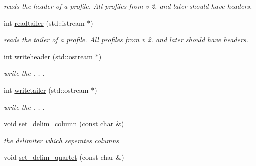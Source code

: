 \begin{DoxyCompactItemize}
\begin{DoxyCompactList}\small\item\em reads the header of a profile. All profiles from v 2. and later should have headers. \end{DoxyCompactList}\item 
\hypertarget{classprofile__header_af1e7906989052ab477b0cc6819109ce1}{int \hyperlink{classprofile__header_af1e7906989052ab477b0cc6819109ce1}{readtailer} (std\-::istream $\ast$)}\label{classprofile__header_af1e7906989052ab477b0cc6819109ce1}

\begin{DoxyCompactList}\small\item\em reads the tailer of a profile. All profiles from v 2. and later should have headers. \end{DoxyCompactList}\item 
\hypertarget{classprofile__header_aa3cf9f42826a02edaec056d98a12bf55}{int \hyperlink{classprofile__header_aa3cf9f42826a02edaec056d98a12bf55}{writeheader} (std\-::ostream $\ast$)}\label{classprofile__header_aa3cf9f42826a02edaec056d98a12bf55}

\begin{DoxyCompactList}\small\item\em write the . . . \end{DoxyCompactList}\item 
\hypertarget{classprofile__header_aa723135e0c39d89a5110a099dbf988f3}{int \hyperlink{classprofile__header_aa723135e0c39d89a5110a099dbf988f3}{writetailer} (std\-::ostream $\ast$)}\label{classprofile__header_aa723135e0c39d89a5110a099dbf988f3}

\begin{DoxyCompactList}\small\item\em write the . . . \end{DoxyCompactList}\item 
\hypertarget{classprofile__header_a7ab9dc4f50b3633869e666fc19e6a75e}{void \hyperlink{classprofile__header_a7ab9dc4f50b3633869e666fc19e6a75e}{set\-\_\-delim\-\_\-column} (const char \&)}\label{classprofile__header_a7ab9dc4f50b3633869e666fc19e6a75e}

\begin{DoxyCompactList}\small\item\em the delimiter which seperates columns \end{DoxyCompactList}\item 
\hypertarget{classprofile__header_ae394520b6c5dee31982ce0930673e34e}{void \hyperlink{classprofile__header_ae394520b6c5dee31982ce0930673e34e}{set\-\_\-delim\-\_\-quartet} (const char \&)}\label{classprofile__header_ae394520b6c5dee31982ce0930673e34e}


\end{DoxyCompactItemize}

